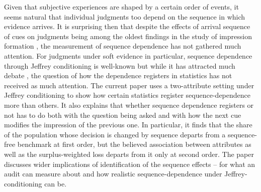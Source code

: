 \documentclass[a4paper,fleqn]{cas-sc}
\theoremstyle{remark}
\theoremstyle{definition}
\begin{document}
Given that subjective experiences are shaped by a certain order of events, it seems natural that individual judgments too depend on the sequence in which evidence arrives. It is surprising then that despite the effects of arrival sequence of cues on judgments being among the oldest findings in the study of impression formation \citep{Asch1946,HogarthEinhorn1992}, the measurement of sequence dependence has not gathered much attention. For judgments under soft evidence in particular, sequence dependence through Jeffrey conditioning is well-known but while it has attracted much debate \citep{DiaconisZabell1982,Hawthorne2004}, the question of how the dependence registers in statistics has not received as much attention. The current paper uses a two-attribute setting under Jeffrey conditioning to show how certain statistics register sequence-dependence more than others. It also explains that whether sequence dependence registers or not has to do both with the question being asked and with how the next cue modifies the impression of the previous one. In particular, it finds that the share of the population whose decision is changed by sequence departs from a sequence-free benchmark at first order, but the believed association between attributes as well as the surplus-weighted loss departs from it only at second order. The paper discusses wider implications of identification of the sequence effects -- for what an audit can measure about and how realistic sequence-dependence under Jeffrey-conditioning can be.
\end{document}
